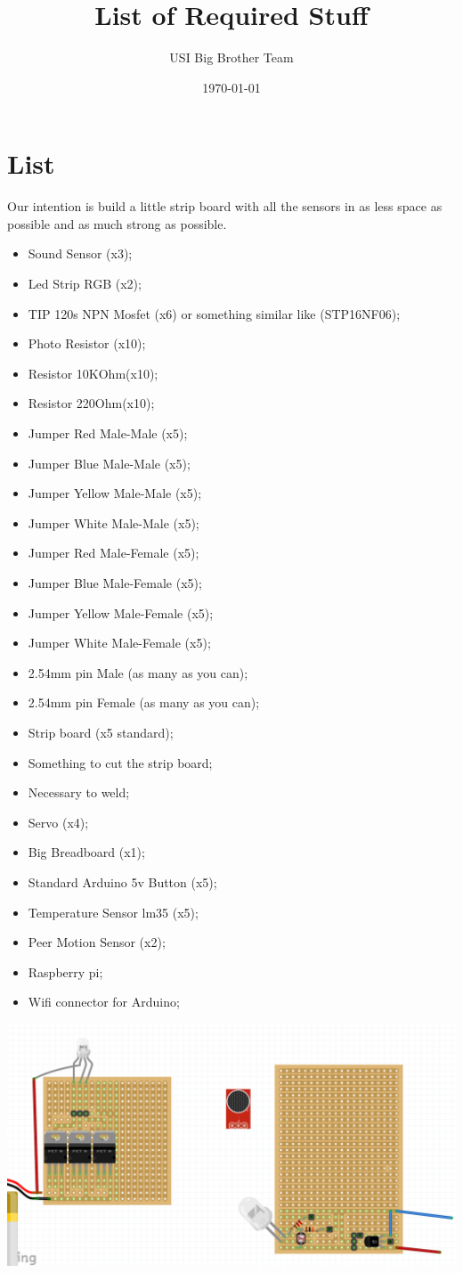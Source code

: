 \documentclass[12pt]{article}
\begin{document}
\title{List of Required Stuff}
\author{USI Big Brother Team}
\date{\today}
\maketitle
\section*{List}
Our intention is build a little strip board with all the sensors in as less space as possible and as much strong as possible.
\begin{itemize}
\item Sound Sensor (x3); \checkmark
\item Led Strip RGB (x2);
\item TIP 120s NPN Mosfet (x6) or something similar like (STP16NF06);
\item Photo Resistor (x10);
\item Resistor 10KOhm(x10);
\item Resistor 220Ohm(x10);
\item Jumper Red Male-Male (x5);
\item Jumper Blue Male-Male (x5);
\item Jumper Yellow Male-Male (x5);
\item Jumper White Male-Male (x5);
\item Jumper Red Male-Female (x5);
\item Jumper Blue Male-Female (x5);
\item Jumper Yellow Male-Female (x5);
\item Jumper White Male-Female (x5);
\item 2.54mm pin Male (as many as you can);
\item 2.54mm pin Female (as many as you can);
\item Strip board (x5 standard);
\item Something to cut the strip board;
\item Necessary to weld;
\item Servo (x4);
\item Big Breadboard (x1); \checkmark
\item Standard Arduino 5v Button (x5);
\item Temperature Sensor lm35 (x5);
\item Peer Motion Sensor (x2);
\item Raspberry pi; \checkmark
\item Wifi connector for Arduino; \checkmark

\end{itemize}
\includegraphics[scale=0.5]{stripBoard}
\end{document}
